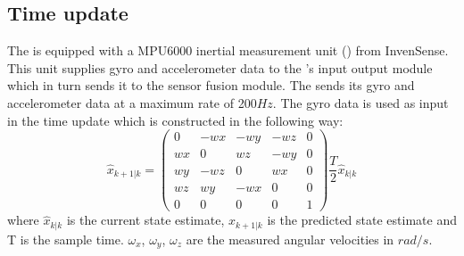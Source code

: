 \subsection{Time update}
The \abbrROV is equipped with a MPU6000 inertial measurement unit (\abbrIMU) from InvenSense.
This unit supplies gyro and accelerometer data to the \abbrROV's input output module which in turn sends it to the sensor fusion module. The \abbrIMU sends its gyro and accelerometer data at a maximum rate of 200$Hz$.
The gyro data is used as input in the \abbrEKF time update which is constructed in the following way:
\begin{equation}
   \hat{x}_{k+1|k} = 
   \begin{pmatrix}
    0 & -wx & -wy & -wz & 0\\
    wx & 0 &  wz & -wy & 0\\
    wy & -wz & 0 &  wx & 0\\
    wz &  wy & -wx & 0 & 0\\
    0 & 0 & 0 & 0 & 1
   \end{pmatrix}
    \frac{T}{2}\hat{x}_{k|k}
\end{equation}
where $\hat{x}_{k|k}$ is the current state estimate, $\hat{x}_{k+1|k}$ is the predicted state estimate and T is the sample time.
$\omega_x$, $\omega_y$, $\omega_z$ are the measured angular velocities in $rad/s$.

